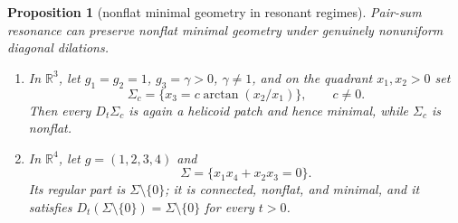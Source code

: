 \documentclass[preprint,12pt]{elsarticle}
\numberwithin{equation}{section}
\newtheorem{proposition}[theorem]{Proposition}
\theoremstyle{definition}\newtheorem{definition}[theorem]{Definition}
\theoremstyle{remark}\newtheorem{remark}[theorem]{Remark}
\begin{document}
\begin{proposition}[nonflat minimal geometry in resonant regimes]\label{prop:resonance}
Pair-sum resonance can preserve nonflat minimal geometry under genuinely nonuniform diagonal dilations.
\begin{enumerate}
\item In $\mathbb R^3$, let $g_1=g_2=1$, $g_3=\gamma>0$, $\gamma\ne1$, and on the quadrant $x_1,x_2>0$ set
\begin{equation}\label{eq:helicoid}
\Sigma_c=\{x_3=c\arctan(x_2/x_1)\},\qquad c\ne0.
\end{equation}
Then every $D_t\Sigma_c$ is again a helicoid patch and hence minimal, while $\Sigma_c$ is nonflat.
\item In $\mathbb R^4$, let $g=(1,2,3,4)$ and
\begin{equation}\label{eq:cone}
\Sigma=\{x_1x_4+x_2x_3=0\}.
\end{equation}
Its regular part is $\Sigma\setminus\{0\}$; it is connected, nonflat, and minimal, and it satisfies $D_t(\Sigma\setminus\{0\})=\Sigma\setminus\{0\}$ for every $t>0$.
\end{enumerate}
\end{proposition}
\end{document}
